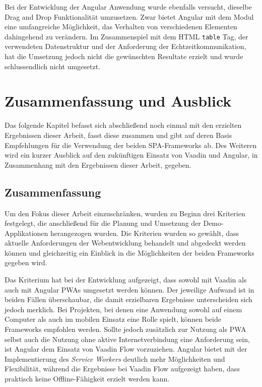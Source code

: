 \documentclass[a4paper,12pt,twoside]{scrreprt}
\begin{document}
\medskip

Bei der Entwicklung der Angular Anwendung wurde ebenfalls versucht, dieselbe Drag and Drop Funktionalität umzusetzen. Zwar bietet Angular mit dem  Modul eine umfangreiche Möglichkeit, das Verhalten von verschiedenen Elementen dahingehend zu verändern. Im Zusammenspiel mit dem HTML \texttt{table} Tag, der verwendeten Datenstruktur und der Anforderung der Echtzeitkommunikation, hat die Umsetzung jedoch nicht die gewünschten Resultate erzielt und wurde schlussendlich nicht umgesetzt.

\chapter{Zusammenfassung und Ausblick}
\label{chap:zusammenfassung-ausblick}
Das folgende Kapitel befasst sich abschließend noch einmal mit den erzielten Ergebnissen dieser Arbeit, fasst diese zusammen und gibt auf deren Basis Empfehlungen für die Verwendung der beiden \ac{SPA}-Frameworks ab. Des Weiteren wird ein kurzer Ausblick auf den zukünftigen Einsatz von Vaadin und Angular, in Zusammenhang mit den Ergebnissen dieser Arbeit, gegeben.

\section{Zusammenfassung}
\label{sec:zusammenfassung}
Um den Fokus dieser Arbeit einzuschränken, wurden zu Beginn drei Kriterien festgelegt, die anschließend für die Planung und Umsetzung der Demo-Applikationen herangezogen wurden. Die Kriterien wurden so gewählt, dass aktuelle Anforderungen der Webentwicklung behandelt und abgedeckt werden können und gleichzeitig ein Einblick in die Möglichkeiten der beiden Frameworks gegeben wird.

\medskip

Das Kriterium \textit{} hat bei der Entwicklung aufgezeigt, dass sowohl mit Vaadin als auch mit Angular \acp{PWA} umgesetzt werden können. Der jeweilige Aufwand ist in beiden Fällen überschaubar, die damit erzielbaren Ergebnisse unterscheiden sich jedoch merklich. Bei Projekten, bei denen eine Anwendung sowohl auf einem Computer als auch im mobilen Einsatz eine Rolle spielt, können beide Frameworks empfohlen werden. Sollte jedoch zusätzlich zur Nutzung als \ac{PWA} selbst auch die Nutzung ohne aktive Internetverbindung eine Anforderung sein, ist Angular dem Einsatz von Vaadin Flow vorzuziehen. Angular bietet mit der Implementierung des \textit{Service Workers} deutlich mehr Möglichkeiten und Flexibilität, während die Ergebnisse bei Vaadin Flow aufgezeigt haben, dass praktisch keine Offline-Fähigkeit erzielt werden kann.
\end{document}
